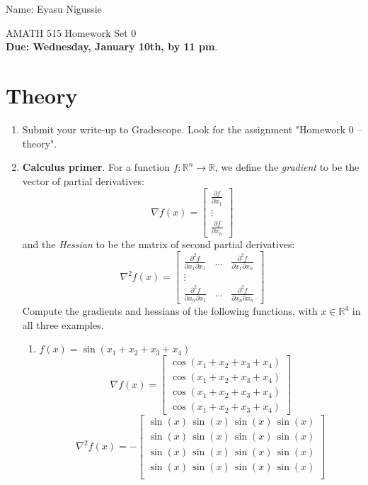 \documentclass[11pt]{amsart}
\begin{document}
{\Large Name: Eyasu Nigussie}  \\
\begin{center}
\Large AMATH 515 \hskip 2in Homework Set 0\\
{\bf Due:  Wednesday, January 10th, by 11 pm}. 
\end{center}

\bigskip


\section{Theory}
\begin{enumerate}
	\item Submit your write-up to Gradescope. Look for the assignment "Homework 0 -- theory".

\item {\bf Calculus primer}. For a function $f:\mathbb{R}^n \rightarrow \mathbb{R}$, we define the 
{\it gradient} to be the vector of partial derivatives: 
\[
\nabla f(x) = \begin{bmatrix} \frac{\partial f}{\partial x_1} \\ \vdots \\ \frac{\partial f}{\partial x_n}\end{bmatrix}
\]
and the {\it Hessian} to be the matrix of second partial derivatives: 
\[
\nabla^2 f(x) = 
\begin{bmatrix} \frac{\partial^2 f}{\partial x_1 \partial x_1}  & \dots & \frac{\partial^2 f}{\partial x_1 \partial x_n}
\\ \vdots 
\\ \frac{\partial^2 f}{\partial x_n \partial x_1} & \dots & \frac{\partial^2 f}{\partial x_n \partial x_n}\end{bmatrix}
\]
Compute the gradients and hessians of the following functions, with $x \in \mathbb{R}^4$ in all three examples. 
\begin{enumerate}
\item $f(x) = \sin(x_1 + x_2 + x_3 + x_4)$ \\ 
\[
\nabla f(x)= 
 \begin{bmatrix} \cos(x_1+x_2+x_3+x_4) \\ \cos(x_1+x_2+x_3+x_4) \\ \cos(x_1+x_2+x_3+x_4) \\ \cos(x_1+x_2+x_3+x_4)\end{bmatrix}
\] 
\[
\nabla^2 f(x) =
- \begin{bmatrix} \sin(x)\, \sin(x)\, \sin(x)\, \sin(x) \\
                  \sin(x)\, \sin(x)\, \sin(x)\, \sin(x) \\
                  \sin(x)\, \sin(x)\, \sin(x)\, \sin(x) \\
                  \sin(x)\, \sin(x)\, \sin(x)\, \sin(x) \\               
    \end{bmatrix}
\]


\end{enumerate}
\end{enumerate}
\end{document}
